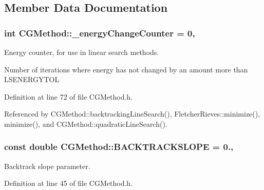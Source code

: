 \subsection{Member Data Documentation}
\hypertarget{classCGMethod_aadb778c988685e46d7d109350973d826}{
\subsubsection[{\+\_\+energy\+Change\+Counter}]{\setlength{\rightskip}{0pt plus 5cm}int C\+G\+Method\+::\+\_\+energy\+Change\+Counter = 0\hspace{0.3cm}{\ttfamily [protected]}, {\ttfamily [inherited]}}}\label{classCGMethod_aadb778c988685e46d7d109350973d826}


Energy counter, for use in linear search methods. 

Number of iterations where energy has not changed by an amount more than L\+S\+E\+N\+E\+R\+G\+Y\+T\+O\+L 

Definition at line 72 of file C\+G\+Method.\+h.



Referenced by C\+G\+Method\+::backtracking\+Line\+Search(), Fletcher\+Rieves\+::minimize(), minimize(), and C\+G\+Method\+::quadratic\+Line\+Search().

\hypertarget{classCGMethod_aa7a8cad90cb1961052e323ded645b4c2}{
\subsubsection[{B\+A\+C\+K\+T\+R\+A\+C\+K\+S\+L\+O\+P\+E}]{\setlength{\rightskip}{0pt plus 5cm}const double C\+G\+Method\+::\+B\+A\+C\+K\+T\+R\+A\+C\+K\+S\+L\+O\+P\+E = 0.\hspace{0.3cm}{\ttfamily [protected]}, {\ttfamily [inherited]}}}\label{classCGMethod_aa7a8cad90cb1961052e323ded645b4c2}


Backtrack slope parameter. 



Definition at line 45 of file C\+G\+Method.\+h.



